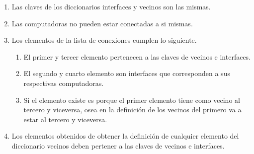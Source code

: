 \hspace*{\disSubSubSecMargen}
\begin{enumerate}
\setlength{\itemindent}{3em}
  \item Las claves de los diccionarios interfaces y vecinos son las mismas.
  \item Las computadoras no pueden estar conectadas a si mismas.
  \item Los elementos de la lista de conexiones cumplen lo siguiente.
    \begin{enumerate}
    \setlength{\itemindent}{3em}
      \item El primer y tercer elemento pertenecen a las claves de vecinos e interfaces.
      \item El segundo y cuarto elemento son interfaces que corresponden a sus respectivas computadoras.
      \item Si el elemento existe es porque el primer elemento tiene como vecino al tercero y viceversa, osea en la \hspace*{3em}definici\'on de los vecinos del primero va a estar al tercero y viceversa.
    \end{enumerate}
  \item Los elementos obtenidos de obtener la definici\'on de cualquier elemento del diccionario vecinos deben pertener \hspace*{3em}a las claves de vecinos e interfaces.
\end{enumerate}

